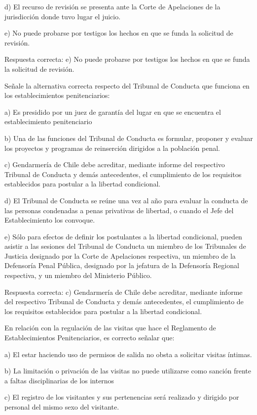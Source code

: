 \documentclass[letterpaper, 11pt]{article}
\begin{document}
d) El recurso de revisión se presenta ante la Corte de Apelaciones de la jurisdicción
donde tuvo lugar el juicio.

e) No puede probarse por testigos los hechos en que se funda la solicitud de
revisión.

Respuesta correcta:
e) No puede probarse por testigos los hechos en que se
funda la solicitud de revisión.


Señale la alternativa correcta respecto del Tribunal de Conducta que funciona en los
establecimientos penitenciarios:

a) Es presidido por un juez de garantía del lugar en que se encuentra el establecimiento
penitenciario

b) Una de las funciones del Tribunal de Conducta es formular, proponer y evaluar los
proyectos y programas de reinserción dirigidos a la población penal.

c) Gendarmería de Chile debe acreditar, mediante informe del respectivo Tribunal de
Conducta y demás antecedentes, el cumplimiento de los requisitos establecidos para
postular a la libertad condicional.

d) El Tribunal de Conducta se reúne una vez al año para evaluar la conducta de las
personas condenadas a penas privativas de libertad, o cuando el Jefe del Establecimiento
los convoque.

e) Sólo para efectos de definir los postulantes a la libertad condicional, pueden asistir a las
sesiones del Tribunal de Conducta un miembro de los Tribunales de Justicia designado por
la Corte de Apelaciones respectiva, un miembro de la Defensoría Penal Pública, designado
por la jefatura de la Defensoría Regional respectiva, y un miembro del Ministerio Público.

Respuesta correcta:
c) Gendarmería de Chile debe acreditar, mediante informe del
respectivo Tribunal de Conducta y demás antecedentes, el cumplimiento de los
requisitos establecidos para postular a la libertad condicional.

En relación con la regulación de las visitas que hace el Reglamento de Establecimientos
Penitenciarios, es correcto señalar que:

a) El estar haciendo uso de permisos de salida no obsta a solicitar visitas íntimas.

b) La limitación o privación de las visitas no puede utilizarse como sanción frente a faltas
disciplinarias de los internos

c) El registro de los visitantes y sus pertenencias será realizado y dirigido por personal del
mismo sexo del visitante.
\end{document}
